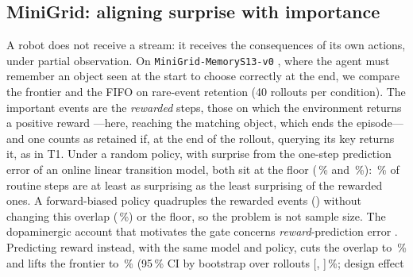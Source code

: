 \documentclass[conference]{IEEEtran}
\begin{document}
\subsection{MiniGrid: aligning surprise with importance}
\label{sec:minigrid}

A robot does not receive a stream: it receives the consequences of its own
actions, under partial observation. On \texttt{MiniGrid-MemoryS13-v0}
\cite{minigrid}, where the agent must remember an object seen at the start to
choose correctly at the end, we compare the frontier and the FIFO on rare-event
retention (40 rollouts per condition). The important events are the
\emph{rewarded} steps, those on which the environment returns a positive
reward ---here, reaching the matching object, which ends the episode--- and
one counts as retained if, at the end of the rollout, querying its key returns
it, as in T1. Under a random policy, with surprise from the one-step prediction
error of an online linear transition model, both sit at the floor
(\,\%
and
\,\%):
\,\%
of routine steps are at least as surprising as the least surprising of the
rewarded ones. A forward-biased policy quadruples the rewarded events
()
without changing this overlap
(\,\%)
or the floor, so the problem is not sample size. The dopaminergic account that
motivates the gate concerns \emph{reward}-prediction error
\cite{schultz1997,rouhani2018}. Predicting reward instead, with the same model
and policy, cuts the overlap to
\,\%
and lifts the frontier to
\,\%
(95\,\% CI by bootstrap over rollouts
[,
]\,\%;
design effect
\end{document}
